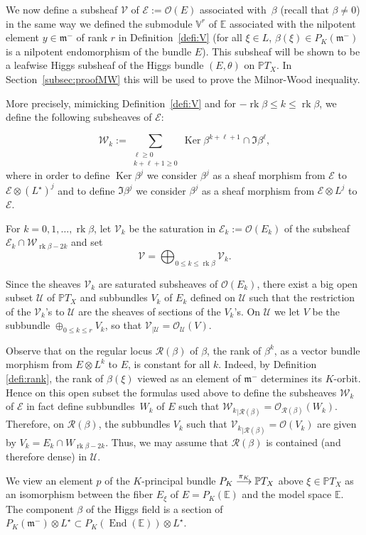 \documentclass[JEP,XML,SOM,Unicode,NoFloatCountersInSection]{cedram}
\let\mathcal\mathscr
\newcommand{\To}[1]{\mathchoice{\xrightarrow{\textstyle\kern4pt#1\kern3pt}}{\stackrel{#1}{\longrightarrow}}{}{}}
\theoremstyle{plain}
\theoremstyle{definition}
\let\rgy r
\DeclareMathOperator{\End}{End}
\DeclareMathOperator{\Ker}{Ker}
\DeclareMathOperator{\rk}{rk}
\newcommand{\cE}{\mathcal{E}}
\newcommand{\cO}{\mathcal{O}}
\newcommand{\cR}{\mathcal{R}}
\newcommand{\cU}{\mathcal{U}}
\newcommand{\cV}{\mathcal{V}}
\newcommand{\cW}{\mathcal{W}}
\newcommand{\bE}{\mathbb{E}}
\newcommand{\PTX}{{\mathbb{P}T_X}}
\newcommand{\Vr}{\mathbb{V}^\rgy}
\newcommand{\fm}{\mathfrak{m}}
\newcommand{\rgb}{{\rk\beta}}
\begin{document}
We now define a subsheaf
$\cV$ of $\cE:=\cO(E)$ associated with~$\beta$ (\hbox{recall} that $\beta\neq 0$) in the same way we
defined the submodule $\Vr$ of $\bE$ associated with the nilpotent element $y\in\fm^-$ of rank $\rgy$
in Definition~\ref{defi:V} (for all $\xi\in L$, \hbox{$\beta(\xi)\in P_K(\fm^-)$} is a nilpotent endomorphism
of the bundle $E$). This subsheaf will be shown to be a leafwise Higgs subsheaf of the Higgs bundle
$(E,\theta)$ on $\PTX$. In Section~\ref{subsec:proofMW} this will be used to prove the Milnor-Wood
inequality.

More precisely, mimicking Definition~\ref{defi:V} and
for $-\rgb\leq k\leq \rgb$, we define the following subsheaves of $\cE$:

$$
\cW_k:=\sum_{\substack{\ell \geq 0 \\ k+\ell+1 \geq 0}}
\Ker \beta^{k+\ell+1} \cap \Im \beta^\ell,
$$
where in order to define $\Ker \beta^j$ we consider $\beta^j$ as a sheaf morphism from $\cE$
to $\cE\otimes {(L^\star)}^j$ and to define $\Im \beta^j$ we consider $\beta^j$ as a sheaf
morphism from $\cE\otimes L^j$ to $\cE$.

For $k=0,1,\ldots,\rgb$, let $\cV_k$ be the saturation in $\cE_k:=\cO(E_k)$ of the
subsheaf $\cE_k\cap \cW_{\rgb-2k}$ and set $$\cV=\bigoplus_{0\leq k\leq \rgb} \cV_k.$$

Since the sheaves $\cV_k$ are saturated subsheaves of $\cO(E_k)$, there exist a big open
subset $\cU$ of $\PTX$
and subbundles $V_k$ of $ E_k$ defined on $\cU$ such that the
restriction of the $\cV_k$'s to $\cU$ are the sheaves of
sections of the $V_k$'s. On $\cU$
we let $V$ be the subbundle $\oplus_{0\leq k\leq r} V_k$, so that $\cV_{|\cU}={\cO}_{\cU}(V)$.

Observe that on the regular locus
$\cR(\beta)$ of $\beta$, the rank of $\beta^k$, as a vector bundle morphism from $E\otimes
L^k$ to $E$, is constant for all $k$. Indeed, by Definition \ref{defi:rank}, the rank of
$\beta(\xi)$ viewed
as an element of $\fm^-$ determines its $K$-orbit.
Hence on this open subset the formulas used above to define the
subsheaves $\cW_k$ of $\cE$ in fact define subbundles~$W_k$ of $E$ such that ${\cW_k}_{|{\cR}(\beta)}=
\cO_{\cR(\beta)}(W_k)$. Therefore, on $\cR(\beta)$, the
subbundles $V_k$ such that ${\cV_k}_{|{\cR}(\beta)}=\cO(V_k)$ are given by $V_k=E_k\cap W_{\rgb-2k}$.
Thus, we may assume that $\cR(\beta)$ is contained (and therefore dense) in $\cU$.

We view an element $p$ of the $K$-principal bundle $P_K \To{\pi_K}\PTX$ above
$\xi\in\PTX$ as an isomorphism between the fiber $ E_\xi$ of $ E=P_K(\bE)$ and the model space $\bE$.
The component $\beta$ of the Higgs field is a section of $P_K(\fm^-)\otimes L^\star\subset
P_K(\End(\bE))\otimes L^\star$.
\end{document}

